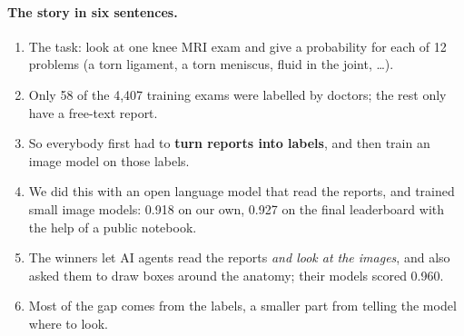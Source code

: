 \paragraph{The story in six sentences.}
\begin{enumerate}
\item The task: look at one knee MRI exam and give a probability for each of 12 problems (a torn ligament,
      a torn meniscus, fluid in the joint, \ldots).
\item Only 58 of the 4,407 training exams were labelled by doctors; the rest only have a free-text report.
\item So everybody first had to \textbf{turn reports into labels}, and then train an image model on those labels.
\item We did this with an open language model that read the reports, and trained small image models: 0.918 on
      our own, 0.927 on the final leaderboard with the help of a public notebook.
\item The winners let AI agents read the reports \emph{and look at the images}, and also asked them to draw boxes
      around the anatomy; their models scored 0.960.
\item Most of the gap comes from the labels, a smaller part from telling the model where to look.
\end{enumerate}
